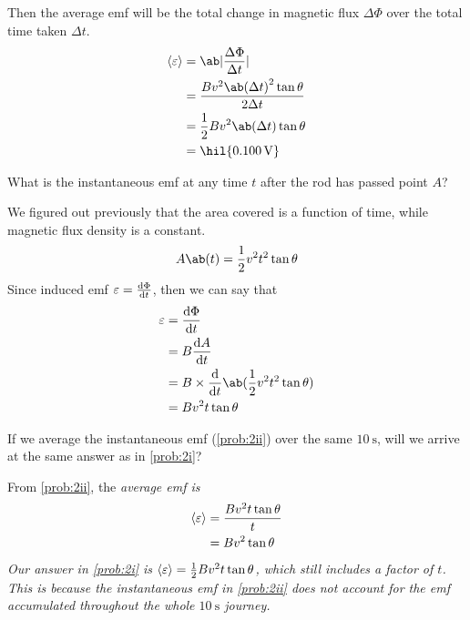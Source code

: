 Then the average emf will be the total change in magnetic flux \(\Delta\Phi\)
over the total time taken \(\Delta t\).
\begin{align*}
	\left\langle\varepsilon\right\rangle & = \ab|\f{\Delta\Phi}{\Delta t}|                  \\
	                                     & = \f{Bv^2{\ab(\Delta t)}^2\tan\theta}{2\Delta t} \\
	                                     & = \f{1}{2}Bv^2\ab(\Delta t)\tan\theta            \\
	                                     & = \hil{\qty{0.100}{\volt}}
\end{align*}

\begin{problem}
What is the instantaneous emf at any time \(t\)
after the rod has passed point \(A\)?
\label{prob:2ii}
\end{problem}
We figured out previously that the area covered is a function of time,
while magnetic flux density is a constant.
\begin{equation*}
	A\ab(t) = \f{1}{2}v^2t^2\tan\theta
\end{equation*}
Since induced emf \(\varepsilon = \odv{\Phi}{t}\), then we can say that
\begin{align*}
	\varepsilon & = \odv{\Phi}{t}                                 \\
	            & = B\odv{A}{t}                                   \\
	            & = B\times\odv{}{t}\ab(\f{1}{2}v^2t^2\tan\theta) \\
	            & = Bv^2t\tan\theta
\end{align*}

\begin{problem}
If we average the instantaneous emf (\cref{prob:2ii}) over the same \(\qty{10}{\second}\),
will we arrive at the same answer as in \cref{prob:2i}?
\end{problem}
From \cref{prob:2ii}, the \it{average} emf is
\begin{align*}
	\left\langle\varepsilon\right\rangle & = \frac{Bv^2t\tan\theta}{t} \\
	                                     & = Bv^2\tan\theta
\end{align*}
Our answer in \cref{prob:2i} is \(\left\langle\varepsilon\right\rangle = \frac{1}{2}Bv^2t\tan\theta\),
which still includes a factor of \(t\). This is because the \it{instantaneous} emf in \cref{prob:2ii}
does not account for the emf accumulated throughout the whole \(\qty{10}{\second}\) journey.


